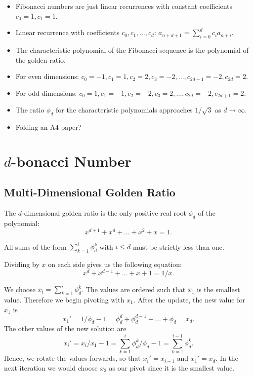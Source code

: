 \documentclass[english,version-2020-11]{uzl-thesis}
\begin{document}
\begin{itemize}
  \item Fibonacci numbers are just linear recurrences with constant coefficients $c_0 = 1, c_1 = 1$.
  \item Linear recurrence with coefficients $c_0, c_1, \dots, c_d$: $a_{n+d+1} = \sum_{i=0}^d c_i a_{n+i}$.
  \item The characteristic polynomial of the Fibonacci sequence is the polynomial of the golden ratio.
  \item For even dimensions: $c_0 = -1, c_1 = 1, c_2 = 2, c_3 = -2, \dots, c_{2d-1} = -2, c_{2d} = 2$.
  \item For odd dimensions:  $c_0 = 1, c_1 = -1, c_2 = -2, c_3 = 2, \dots, c_{2d} = -2, c_{2d+1} = 2$.
  \item The ratio $\phi_d$ for the characteristic polynomials approaches $1/\sqrt{3}$ as $d \to \infty$.
  \item Folding an A4 paper?
\end{itemize}

\chapter{$d$-bonacci Number}

\section{Multi-Dimensional Golden Ratio}

\begin{definition}
  The $d$-dimensional golden ratio is the only positive real root $\phi_d$ of the polynomial:
  \[
    x^{d+1} + x^d + \dots + x^2 + x = 1.
  \]
\end{definition}

All sums of the form $\sum_{k=1}^i \phi_d^k$ with $i \le d$ must be strictly less than one.

Dividing by $x$ on each side gives us the following equation:
\[
  x^d + x^{d-1} + \dots + x + 1 = 1/x.
\]

We choose $x_i = \sum_{k = 1}^i \phi_d^k$.
The values are ordered such that $x_1$ is the smallest value.
Therefore we begin pivoting with $x_1$.
After the update, the new value for $x_1$ is
\[
  x_1' = 1/\phi_d - 1 = \phi_d^d + \phi_d^{d-1} + \dots + \phi_d = x_d.
\]
The other values of the new solution are
\[
  x_i' = x_i / x_1 - 1 = \sum_{k = 1}^i \phi_d^k / \phi_d - 1 = \sum_{k=1}^{i-1} \phi_d^k.
\]
Hence, we rotate the values forwards, so that $x_i' = x_{i-1}$ and $x_1' = x_d$.
In the next iteration we would choose $x_2$ as our pivot since it is the smallest value.
\end{document}
